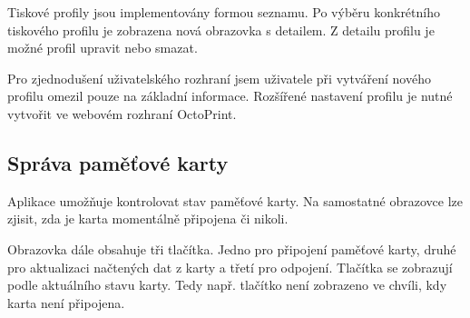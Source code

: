 Tiskové profily jsou implementovány formou seznamu.
Po výběru konkrétního tiskového profilu je zobrazena nová obrazovka s detailem.
Z detailu profilu je možné profil upravit nebo smazat.

Pro zjednodušení uživatelského rozhraní jsem uživatele při vytváření nového profilu omezil pouze na základní informace.
Rozšířené nastavení profilu je nutné vytvořit ve webovém rozhraní OctoPrint.

\subsection{Správa paměťové karty}

Aplikace umožňuje kontrolovat stav paměťové karty.
Na samostatné obrazovce lze zjisit, zda je karta momentálně připojena či nikoli.

Obrazovka dále obsahuje tři tlačítka.
Jedno pro připojení paměťové karty, druhé pro aktualizaci načtených dat z karty a třetí pro odpojení.
Tlačítka se zobrazují podle aktuálního stavu karty.
Tedy např. tlačítko  není zobrazeno ve chvíli, kdy karta není připojena.
